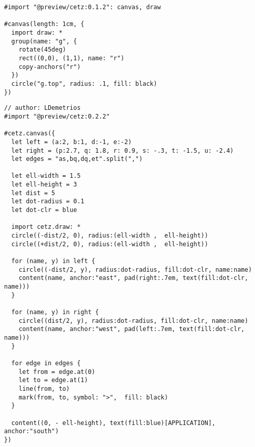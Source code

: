 \pandocbounded{}

\begin{verbatim}
#import "@preview/cetz:0.1.2": canvas, draw

#canvas(length: 1cm, {
  import draw: *
  group(name: "g", {
    rotate(45deg)
    rect((0,0), (1,1), name: "r")
    copy-anchors("r")
  })
  circle("g.top", radius: .1, fill: black)
})
\end{verbatim}

\pandocbounded{}

\begin{verbatim}
// author: LDemetrios
#import "@preview/cetz:0.2.2"

#cetz.canvas({
  let left = (a:2, b:1, d:-1, e:-2)
  let right = (p:2.7, q: 1.8, r: 0.9, s: -.3, t: -1.5, u: -2.4)
  let edges = "as,bq,dq,et".split(",")

  let ell-width = 1.5
  let ell-height = 3
  let dist = 5
  let dot-radius = 0.1
  let dot-clr = blue

  import cetz.draw: *
  circle((-dist/2, 0), radius:(ell-width ,  ell-height))
  circle((+dist/2, 0), radius:(ell-width ,  ell-height))

  for (name, y) in left {
    circle((-dist/2, y), radius:dot-radius, fill:dot-clr, name:name)
    content(name, anchor:"east", pad(right:.7em, text(fill:dot-clr, name)))
  }

  for (name, y) in right {
    circle((dist/2, y), radius:dot-radius, fill:dot-clr, name:name)
    content(name, anchor:"west", pad(left:.7em, text(fill:dot-clr, name)))
  }

  for edge in edges {
    let from = edge.at(0)
    let to = edge.at(1)
    line(from, to)
    mark(from, to, symbol: ">",  fill: black)
  }

  content((0, - ell-height), text(fill:blue)[APPLICATION], anchor:"south")
})
\end{verbatim}

\pandocbounded{}
